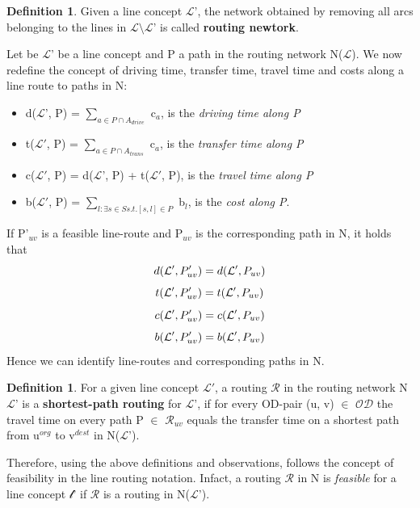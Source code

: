 \documentclass[
  twoside,
  11pt, a4paper,
  footinclude=true,
  headinclude=true,
  cleardoublepage=empty
]{book}
\theoremstyle{definition}
\newtheorem{definition}[theorem]{Definition}
\begin{document}
\begin{definition} Given a line concept $\mathcal{L}$', the network obtained by removing all arcs belonging to the lines in $\mathcal{L}\setminus\mathcal{L}$' is called \textbf{routing newtork}.
\end{definition}
Let be $\mathcal{L}$' be a line concept and P a path in the routing network N($\mathcal{L}$). We now redefine the concept of driving time, transfer time, travel time and costs along a line route to paths in N: 
\begin{itemize}
\item d($\mathcal{L}$', P) = $\sum_{a \in P \cap A_{drive}}$ c$_a$, is the \emph{driving time along P}
\item t($\mathcal{L}'$, P) = $\sum_{a \in P \cap A_{trans}}$ c$_a$, is the \emph{transfer time along P}
\item c($\mathcal{L}'$, P) = d($\mathcal{L}$', P) + t($\mathcal{L}'$, P), is the \emph{travel time along P}
\item b($\mathcal{L}'$, P) = $\sum_{l:\exists s\in S s.t. [s,l]\in P}$ b$_l$, is the \emph{cost along P}.
\end{itemize}
If P'$_{uv}$ is a feasible line-route and P$_{uv}$ is the corresponding path in N, it holds that
\begin{equation} \notag
d(\mathcal{L}', P'_{uv}) = d(\mathcal{L}', P_{uv})
\end{equation} \notag
\begin{equation} \notag
t(\mathcal{L}', P'_{uv}) = t(\mathcal{L}', P_{uv})
\end{equation} \notag
\begin{equation} \notag
c(\mathcal{L}', P'_{uv}) = c(\mathcal{L}', P_{uv})
\end{equation}
\begin{equation} \notag
b(\mathcal{L}', P'_{uv}) = b(\mathcal{L}', P_{uv})
\end{equation}
Hence we can identify line-routes and corresponding paths in N.\newline
\begin{definition} For a given line concept $\mathcal{L}'$, a routing $\mathcal{R}$ in the routing network N$\mathcal{L}$' is a \textbf{shortest-path routing} for $\mathcal{L}$', if for every OD-pair (u, v) $\in$ $\mathcal{OD}$ the travel time on every path P $\in$ $\mathcal{R}_{uv}$ equals the transfer time on a shortest path from u$^{org}$ to v$^{dest}$ in N($\mathcal{L}$').
\end{definition}
Therefore, using the above definitions and observations, follows the concept of feasibility in the line routing notation. Infact, a routing $\mathcal{R}$ in N is \emph{feasible} for a line concept $\mathcal{l}$' if $\mathcal{R}$ is a routing in N($\mathcal{L}$'). \newline
\end{document}
